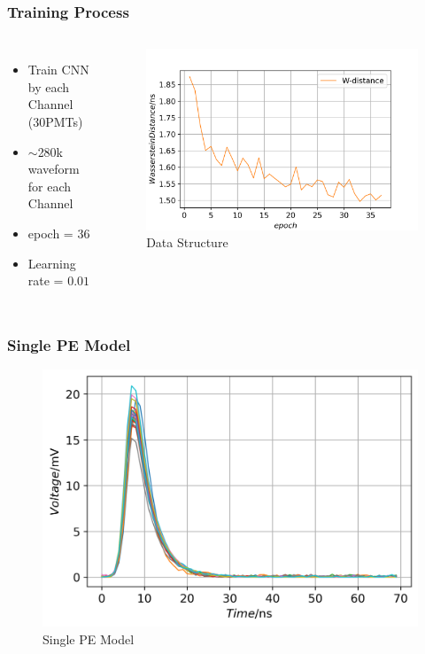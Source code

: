 \documentclass{beamer}
\begin{document}
\begin{frame}
\frametitle{Training Process}
\begin{columns}
\begin{itemize}
    \item Train CNN by each Channel (30PMTs)
    \item $\sim$280k waveform for each Channel
    \item epoch = 36
    \item Learning rate = $0.01$
\end{itemize}
\begin{figure}
    \centering
    \caption{Data Structure}
    \includegraphics[width=1.0\linewidth]{img/epoch.png}
\end{figure}
\end{columns}
\end{frame}

\begin{frame}
\frametitle{Single PE Model}
\begin{figure}
    \centering
    \caption{Single PE Model}
    \includegraphics[width=0.9\linewidth]{img/spe.png}
\end{figure}
\end{frame}
\end{document}
